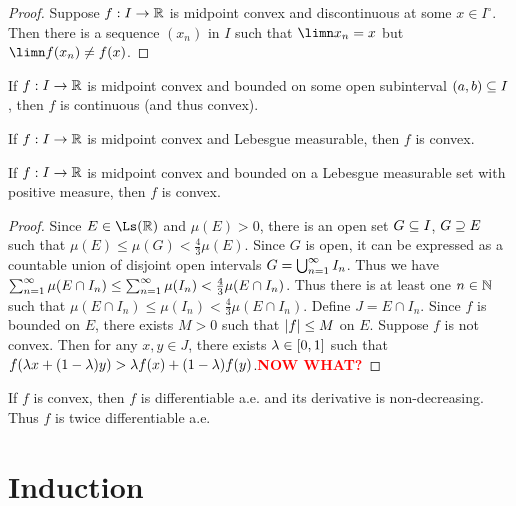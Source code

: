 \documentclass{article}
\newcommand{\remind}[1]{\textcolor{red}{\textbf{#1}}} %
\begin{document}
\begin{proof}
    Suppose $f:I\to\R$ is midpoint convex and discontinuous at some $x\in I^\circ$. Then there is a sequence $(x_n)$ in $I$ such that $\limn x_n=x$ but $\limn f(x_n)\ne f(x)$.
\end{proof}

\begin{theorem}
    If $f:I\to\R$ is midpoint convex and bounded on some open subinterval $(a,b)\subseteq I$, then $f$ is continuous (and thus convex).
\end{theorem}

\begin{theorem}
    If $f:I\to\R$ is midpoint convex and Lebesgue measurable, then $f$ is convex.
\end{theorem}

\begin{theorem}
    If $f:I\to\R$ is midpoint convex and bounded on a Lebesgue measurable set with positive measure, then $f$ is convex.
\end{theorem}
\begin{proof}
    Since $E\in\Ls(\R)$ and $\mu(E)>0$, there is an open set $G\subseteq I$, $G\supseteq E$ such that $\mu(E)\le\mu(G)<\frac{4}{3}\mu(E)$. Since $G$ is open, it can be expressed as a countable union of disjoint open intervals $G=\bigcup_{n=1}^\infty I_n$. Thus we have $\sum_{n=1}^\infty\mu(E\cap I_n)\le\sum_{n=1}^\infty\mu(I_n)<\frac{4}{3}\mu(E\cap I_n)$. Thus there is at least one $n\in\N$ such that $\mu(E\cap I_n)\le\mu(I_n)<\frac{4}{3}\mu(E\cap I_n)$. Define $J=E\cap I_n$. Since $f$ is bounded on $E$, there exists $M>0$ such that $\abs{f}\le M$ on $E$. Suppose $f$ is not convex. Then for any $x,y\in J$, there exists $\lambda\in[0,1]$ such that $f(\lambda x+(1-\lambda)y)>\lambda f(x)+(1-\lambda)f(y)$.\remind{NOW WHAT?}
\end{proof}

If $f$ is convex, then $f$ is differentiable a.e. and its derivative is non-decreasing. Thus $f$ is twice differentiable a.e.

\section{Induction}
\end{document}
